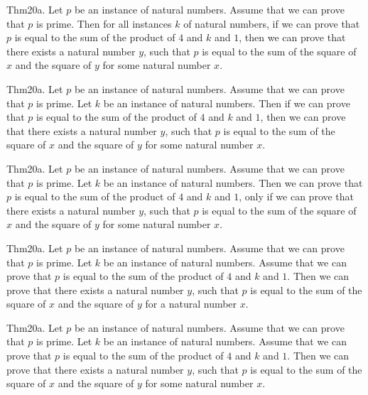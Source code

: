 \documentclass{article}
\begin{document}
Thm20a. Let $p$ be an instance of natural numbers. Assume that we can prove that $p$ is prime. Then for all instances $k$ of natural numbers, if we can prove that $p$ is equal to the sum of the product of $4$ and $k$ and $1$, then we can prove that there exists a natural number $y$, such that $p$ is equal to the sum of the square of $x$ and the square of $y$ for some natural number $x$.

Thm20a. Let $p$ be an instance of natural numbers. Assume that we can prove that $p$ is prime. Let $k$ be an instance of natural numbers. Then if we can prove that $p$ is equal to the sum of the product of $4$ and $k$ and $1$, then we can prove that there exists a natural number $y$, such that $p$ is equal to the sum of the square of $x$ and the square of $y$ for some natural number $x$.

Thm20a. Let $p$ be an instance of natural numbers. Assume that we can prove that $p$ is prime. Let $k$ be an instance of natural numbers. Then we can prove that $p$ is equal to the sum of the product of $4$ and $k$ and $1$, only if we can prove that there exists a natural number $y$, such that $p$ is equal to the sum of the square of $x$ and the square of $y$ for some natural number $x$.

Thm20a. Let $p$ be an instance of natural numbers. Assume that we can prove that $p$ is prime. Let $k$ be an instance of natural numbers. Assume that we can prove that $p$ is equal to the sum of the product of $4$ and $k$ and $1$. Then we can prove that there exists a natural number $y$, such that $p$ is equal to the sum of the square of $x$ and the square of $y$ for a natural number $x$.

Thm20a. Let $p$ be an instance of natural numbers. Assume that we can prove that $p$ is prime. Let $k$ be an instance of natural numbers. Assume that we can prove that $p$ is equal to the sum of the product of $4$ and $k$ and $1$. Then we can prove that there exists a natural number $y$, such that $p$ is equal to the sum of the square of $x$ and the square of $y$ for some natural number $x$.
\end{document}
